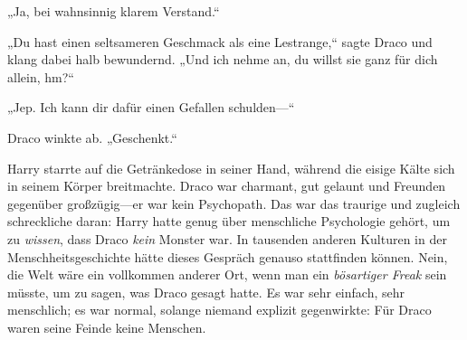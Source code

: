 „Ja, bei wahnsinnig klarem Verstand.“

„Du hast einen seltsameren Geschmack als eine Lestrange,“ sagte Draco und klang dabei halb bewundernd. „Und ich nehme an, du willst sie ganz für dich allein, hm?“

„Jep. Ich kann dir dafür einen Gefallen schulden—“

Draco winkte ab. „Geschenkt.“

Harry starrte auf die Getränkedose in seiner Hand, während die eisige Kälte sich in seinem Körper breitmachte. Draco war charmant, gut gelaunt und Freunden gegenüber großzügig—er war kein Psychopath. Das war das traurige und zugleich schreckliche daran: Harry hatte genug über menschliche Psychologie gehört, um zu \emph{wissen}, dass Draco \emph{kein} Monster war. In tausenden anderen Kulturen in der Menschheitsgeschichte hätte dieses Gespräch genauso stattfinden können. Nein, die Welt wäre ein vollkommen anderer Ort, wenn man ein \emph{bösartiger Freak} sein müsste, um zu sagen, was Draco gesagt hatte. Es war sehr einfach, sehr menschlich; es war normal, solange niemand explizit gegenwirkte: Für Draco waren seine Feinde keine Menschen.

